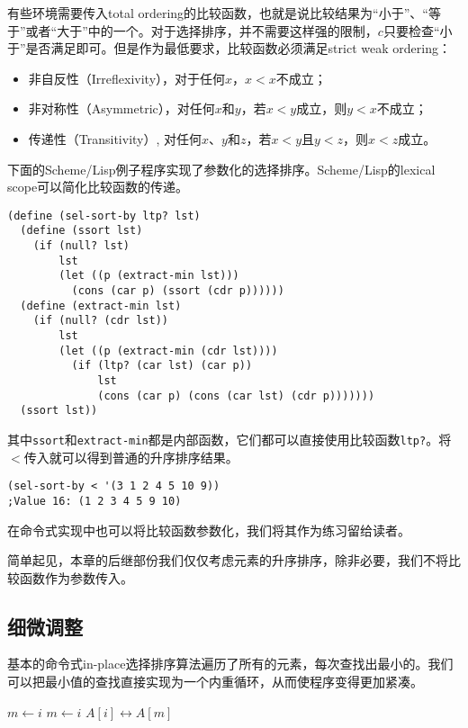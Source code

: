 \documentclass[UTF8]{article}
\begin{document}
有些环境需要传入total ordering的比较函数，也就是说比较结果为“小于”、“等于”或者“大于”中的一个。对于选择排序，并不需要这样强的限制，$c$只要检查“小于”是否满足即可。但是作为最低要求，比较函数必须满足strict weak ordering\cite{wiki-sweak-order}：

\begin{itemize}
\item 非自反性（Irreflexivity），对于任何$x$，$x < x$不成立；
\item 非对称性（Asymmetric），对任何$x$和$y$，若$x < y$成立，则$y < x$不成立；
\item 传递性（Transitivity）, 对任何$x$、$y$和$z$，若$x < y$且$y < z$，则$x < z$成立。
\end{itemize}

下面的Scheme/Lisp例子程序实现了参数化的选择排序。Scheme/Lisp的lexical scope可以简化比较函数的传递。

\lstset{language=Lisp}
\begin{lstlisting}
(define (sel-sort-by ltp? lst)
  (define (ssort lst)
    (if (null? lst)
        lst
        (let ((p (extract-min lst)))
          (cons (car p) (ssort (cdr p))))))
  (define (extract-min lst)
    (if (null? (cdr lst))
        lst
        (let ((p (extract-min (cdr lst))))
          (if (ltp? (car lst) (car p))
              lst
              (cons (car p) (cons (car lst) (cdr p)))))))
  (ssort lst))
\end{lstlisting}

其中\texttt{ssort}和\texttt{extract-min}都是内部函数，它们都可以直接使用比较函数\texttt{ltp?}。将$<$传入就可以得到普通的升序排序结果。

\lstset{language=Lisp}
\begin{lstlisting}
(sel-sort-by < '(3 1 2 4 5 10 9))
;Value 16: (1 2 3 4 5 9 10)
\end{lstlisting}

在命令式实现中也可以将比较函数参数化，我们将其作为练习留给读者。

简单起见，本章的后继部份我们仅仅考虑元素的升序排序，除非必要，我们不将比较函数作为参数传入。

\subsection{细微调整}

基本的命令式in-place选择排序算法遍历了所有的元素，每次查找出最小的。我们可以把最小值的查找直接实现为一个内重循环，从而使程序变得更加紧凑。

\begin{algorithmic}
    \State $m \gets i$
        \State $m \gets i$
      \EndIf
    \EndFor
    \State {} $A[i] \leftrightarrow A[m]$
  \EndFor
\EndProcedure
\end{algorithmic}
\end{document}
